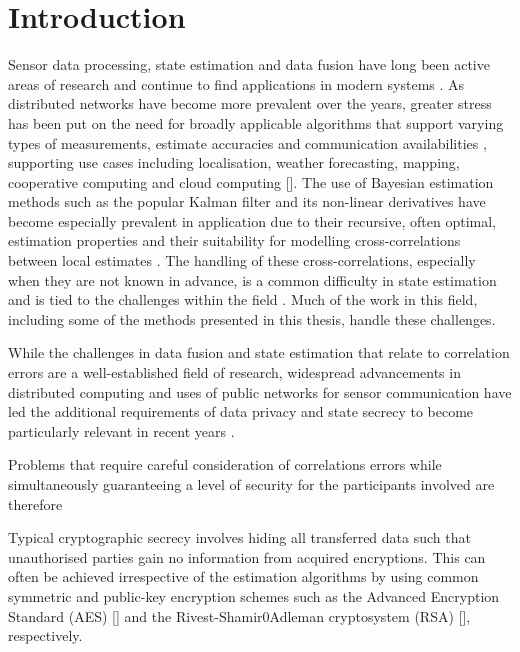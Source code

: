 
\chapter{Introduction}
Sensor data processing, state estimation and data fusion have long been active areas of research and continue to find applications in modern systems \cite{andersonOptimalFiltering1979,simonOptimalStateEstimation2006}. As distributed networks have become more prevalent over the years, greater stress has been put on the need for broadly applicable algorithms that support varying types of measurements, estimate accuracies and communication availabilities \cite{mutambaraDecentralizedEstimationControl1998,ligginsDistributedDataFusion2012}, supporting use cases including localisation, weather forecasting, mapping, cooperative computing and cloud computing []. The use of Bayesian estimation methods such as the popular Kalman filter and its non-linear derivatives have become especially prevalent in application due to their recursive, often optimal, estimation properties and their suitability for modelling cross-correlations between local estimates \cite{chongFortyYearsDistributed2017,haugBayesianEstimationTracking2012}. The handling of these cross-correlations, especially when they are not known in advance, is a common difficulty in state estimation and is tied to the challenges within the field \cite{noackTreatmentDependentInformation2017}. Much of the work in this field, including some of the methods presented in this thesis, handle these challenges.

While the challenges in data fusion and state estimation that relate to correlation errors are a well-established field of research, widespread advancements in distributed computing and uses of public networks for sensor communication have led the additional requirements of data privacy and state secrecy to become particularly relevant in recent years \cite{brennerSecretProgramExecution2011,renSecurityChallengesPublic2012}.

Problems that require careful consideration of correlations errors while simultaneously guaranteeing a level of security for the participants involved are therefore

Typical cryptographic secrecy involves hiding all transferred data such that unauthorised parties gain no information from acquired encryptions. This can often be achieved irrespective of the estimation algorithms by using common symmetric and public-key encryption schemes such as the Advanced Encryption Standard (AES) [] and the Rivest-Shamir0Adleman cryptosystem (RSA) [], respectively.


